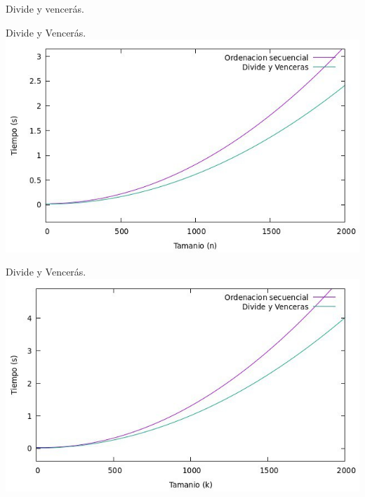 \documentclass[10pt, xcolor=table]{beamer}
\begin{document}
\begin{frame}[fragile]{Divide y vencerás. }
  \begin{table}[h!]
  	\centering
  	\footnotesize
  \end{table}
  \end{frame}
  
  \begin{frame}[fragile]{Divide y Vencerás. }
  \centering
	\includegraphics[scale=0.35]{./Images/Grafica_secvsdyvk.png}
  \end{frame}
  
  \begin{frame}[fragile]{Divide y Vencerás. }
  \centering
	\includegraphics[scale=0.35]{./Images/Grafica_secvsdyvn.png}
  \end{frame}
\end{document}
